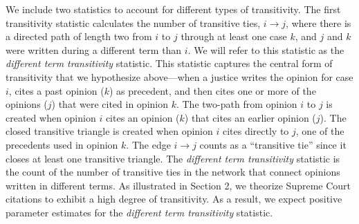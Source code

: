 \documentclass[headsepline=true, abstracton]{scrartcl}
\begin{document}
We include two statistics to account for different types of transitivity. The first transitivity statistic calculates the number of transitive ties, $i \to j$, where there is a directed path of length two from $i$ to $j$ through at least one case $k$, and $j$ and $k$ were written during a different term than $i$. We will refer to this statistic as the \textit{different term transitivity} statistic. This statistic captures the central form of transitivity that we hypothesize above---when a justice writes the opinion for case $i$, cites a past opinion ($k$) as precedent, and then cites one or more of the opinions ($j$) that were cited in opinion $k$. The two-path from opinion $i$ to $j$ is created when opinion $i$ cites an opinion ($k$) that cites an earlier opinion ($j$). The closed transitive triangle is created when opinion $i$ cites directly to $j$, one of the precedents used in opinion $k$. The edge $i \to j$ counts as a ``transitive tie'' since it closes at least one transitive triangle. The \textit{different term transitivity}  statistic is the count of the number of transitive ties in the network that connect opinions written in different terms. As illustrated in Section 2, we theorize Supreme Court citations to exhibit a high degree of transitivity. As a result, we expect positive parameter estimates for the \textit{different term transitivity} statistic.
\end{document}
